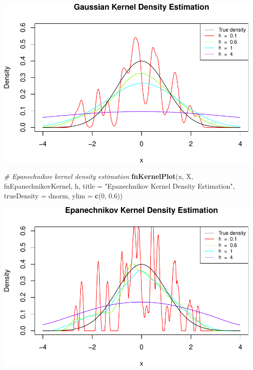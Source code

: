 \documentclass[10pt,]{article}
\newenvironment{Shaded}{\begin{snugshade}}{\end{snugshade}}
\newcommand{\KeywordTok}[1]{\textcolor[rgb]{0.13,0.29,0.53}{\textbf{{#1}}}}
\newcommand{\DataTypeTok}[1]{\textcolor[rgb]{0.13,0.29,0.53}{{#1}}}
\newcommand{\DecValTok}[1]{\textcolor[rgb]{0.00,0.00,0.81}{{#1}}}
\newcommand{\FloatTok}[1]{\textcolor[rgb]{0.00,0.00,0.81}{{#1}}}
\newcommand{\StringTok}[1]{\textcolor[rgb]{0.31,0.60,0.02}{{#1}}}
\newcommand{\CommentTok}[1]{\textcolor[rgb]{0.56,0.35,0.01}{\textit{{#1}}}}
\newcommand{\NormalTok}[1]{{#1}}
\begin{document}
\includegraphics{project2_files/figure-latex/Kernel density estimation for standard normal-2.pdf}

\begin{Shaded}
\begin{Highlighting}[]
\CommentTok{# Epanechnikov kernel density estimation}
\KeywordTok{fnKernelPlot}\NormalTok{(x, X, fnEpanechnikovKernel, h, }
             \DataTypeTok{title =} \StringTok{"Epanechnikov Kernel Density Estimation"}\NormalTok{,}
             \DataTypeTok{trueDensity =} \NormalTok{dnorm, }\DataTypeTok{ylim =} \KeywordTok{c}\NormalTok{(}\DecValTok{0}\NormalTok{, }\FloatTok{0.6}\NormalTok{))}
\end{Highlighting}
\end{Shaded}

\includegraphics{project2_files/figure-latex/Kernel density estimation for standard normal-3.pdf}
\end{document}
